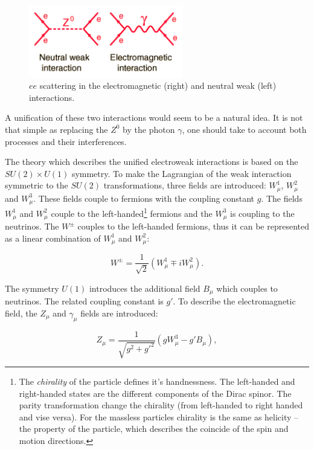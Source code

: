 \begin{figure}[h]
  \centering
  \includegraphics[width=0.6\textwidth]{01_Theory_SM/plots/feynz.png}
  \caption{$ee$ scattering in the electromagnetic (right) and neutral weak (left) interactions.}
  \label{fig:em_weak}
\end{figure}

A unification of these two interactions would seem to be a natural idea. It is not that simple as replacing the $Z^{0}$ by the photon $\gamma$, one
should take to account both processes and their interferences.

The theory which describes the unified electroweak interactions is based on the $SU(2) \times U(1)$ symmetry. To make the Lagrangian of the weak interaction
symmetric to the $SU(2)$ transformations, three fields are introduced: $W_{\mu}^{1}$, $W_{\mu}^{2}$ and $W_{\mu}^{3}$. These fields couple to fermions with
the coupling constant $g$. The fields $W_{\mu}^{1}$ and $W_{\mu}^{2}$ couple to the left-handed\footnote{The \textit{chirality} of the particle defines it's handnessness.
The left-handed and right-handed states are the different components of the Dirac spinor\cite{aitchison2003gauge}. The parity transformation change the chirality (from
left-handed to right handed and vise versa). For the massless particles chirality is the same as helicity -- the property of the particle, which describes the coincide
of the spin and motion directions.} fermions and
the $W_{\mu}^{3}$ is coupling to the neutrinos. The $W^{\pm}$ couples to the left-handed fermions, thus it can be represented as a linear combination of
$W_{\mu}^{1}$ and $W_{\mu}^{2}$:

\begin{equation}
 W^{\pm} = \frac{1}{\sqrt{2}}(W_{\mu}^{1} \mp iW_{\mu}^{2}).
\end{equation}

The symmetry $U(1)$ introduces the additional field $B_{\mu}$ which couples to neutrinos. The related coupling constant is $g'$. To describe the electromagnetic
field, the $Z_{\mu}$ and $\gamma_{\mu}$ fields are introduced:

\begin{equation}\label{eq:Zmu}
 Z_{\mu} = \frac{1}{\sqrt{g^{2} + g'^{2}}}(gW^{3}_{\mu} - g'B_{\mu}),
\end{equation}

